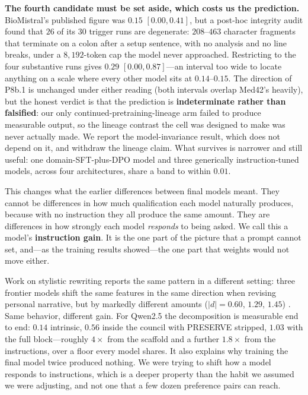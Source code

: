 \documentclass[11pt]{article}
\begin{document}
\textbf{The fourth candidate must be set aside, which costs us the
prediction.} BioMistral's published figure was $0.15$ $[0.00,0.41]$, but a
post-hoc integrity audit found that $26$ of its $30$ trigger runs are
degenerate: $208$--$463$ character fragments that terminate on a colon after
a setup sentence, with no analysis and no line breaks, under a
$8{,}192$-token cap the model never approached. Restricting to the four
substantive runs gives $0.29$ $[0.00,0.87]$---an interval too wide to
locate anything on a scale where every other model sits at $0.14$--$0.15$.
The direction of P8b.1 is unchanged under either reading (both intervals
overlap Med42's heavily), but the honest verdict is that the prediction is
\textbf{indeterminate rather than falsified}: our only
continued-pretraining-lineage arm failed to produce measurable output, so
the lineage contrast the cell was designed to make was never actually made.
We report the model-invariance result, which does not depend on it, and
withdraw the lineage claim. What survives is narrower and still useful: one
domain-SFT-plus-DPO model and three generically instruction-tuned models,
across four architectures, share a band to within $0.01$.

This changes what the earlier differences between final models meant. They
cannot be differences in how much qualification each model naturally
produces, because with no instruction they all produce the same amount. They
are differences in how strongly each model \emph{responds} to being asked. We
call this a model's \textbf{instruction gain}. It is the one part of the
picture that a prompt cannot set, and---as the training results showed---the
one part that weights would not move either.

Work on stylistic rewriting reports the same pattern in a different setting:
three frontier models shift the same features in the same direction when
revising personal narrative, but by markedly different amounts
($|d| = 0.60$, $1.29$, $1.45$) \cite{voicerev}. Same behavior, different
gain. For Qwen2.5 the decomposition is
measurable end to end: $0.14$ intrinsic, $0.56$ inside the council with
PRESERVE stripped, $1.03$ with the full block---roughly $4\times$ from the
scaffold and a further $1.8\times$ from the instructions, over a floor every
model shares. It also explains why training the final model twice produced nothing. We were
trying to shift how a model responds to instructions, which is a deeper
property than the habit we assumed we were adjusting, and not one that a few
dozen preference pairs can reach.
\end{document}
